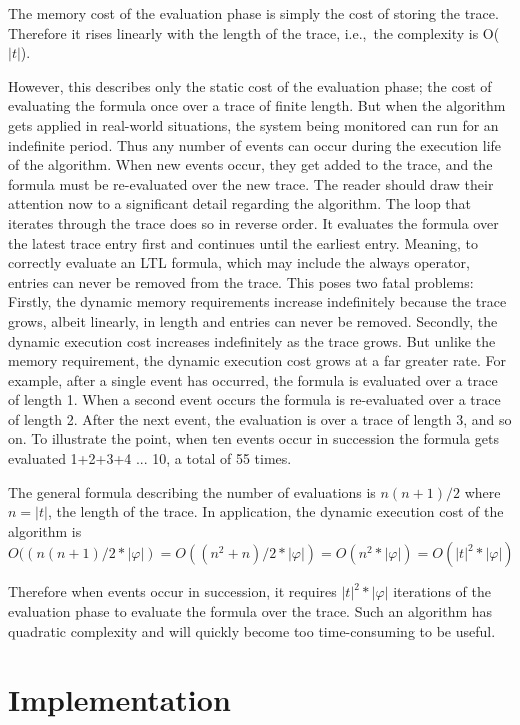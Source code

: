 The memory cost of the evaluation phase is simply the cost of storing the trace.  Therefore it rises linearly with the length of the trace, i.e.,\ the complexity is O($ | t | $).

However, this describes only the static cost of the evaluation phase; the cost of evaluating the formula once over a trace of finite length.  But when the algorithm gets applied in real-world situations, the system being monitored can run for an indefinite period.  Thus any number of events can occur during the execution life of the algorithm.  When new events occur, they get added to the trace, and the formula must be re-evaluated over the new trace.  The reader should draw their attention now to a significant detail regarding the algorithm.  The loop that iterates through the trace does so in reverse order.  It evaluates the formula over the latest trace entry first and continues until the earliest entry.  Meaning, to correctly evaluate an LTL formula, which may include the always operator, entries can never be removed from the trace.  This poses two fatal problems:  Firstly, the dynamic memory requirements increase indefinitely because the trace grows, albeit linearly, in length and entries can never be removed.  Secondly, the dynamic execution cost increases indefinitely as the trace grows.  But unlike the memory requirement, the dynamic execution cost grows at a far greater rate.  For example, after a single event has occurred, the formula is evaluated over a trace of length 1.  When a second event occurs the formula is re-evaluated over a trace of length 2.  After the next event, the evaluation is over a trace of length 3, and so on.  To illustrate the point, when ten events occur in succession the formula gets evaluated 1+2+3+4 ... 10, a total of 55 times.

The general formula describing the number of evaluations is $ n(n+1)/2 $ where $ n = | t |$, the length of the trace.  In application, the dynamic execution cost of the algorithm is $$O((n(n+1)/2 * |\varphi |) = O((n^2+n)/2 * | \varphi |) = O(n^2 * |\varphi |) = O(| t |^2 * |\varphi |)$$

Therefore when events occur in succession, it requires $ | t |^2 * | \varphi | $ iterations of the evaluation phase to evaluate the formula over the trace.  Such an algorithm has quadratic complexity and will quickly become too time-consuming to be useful.

\section{Implementation}
\label{sec:RosuHavelundImplementation}

